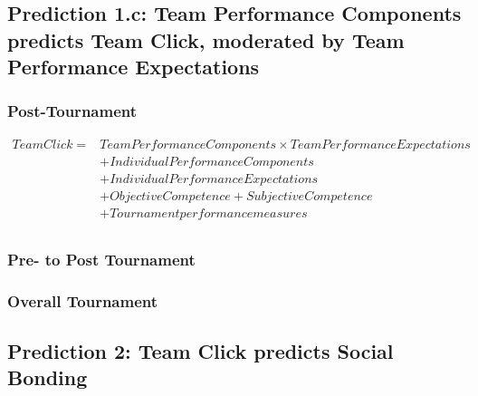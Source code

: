   \subsection{Prediction 1.c: Team Performance Components predicts Team Click, moderated by Team Performance Expectations}

  \subsubsection{Post-Tournament}

       \begin{align*}
         Team Click =  & Team Performance Components \times Team Performance Expectations \\
                   &+ Individual Performance Components \\
                   &+ Individual Performance Expectations \\
                   &+ Objective Competence + Subjective Competence  \\
                   &+ Tournament performance measures \\
       \end{align*}


  



  \subsubsection{Pre- to Post Tournament}

  \subsubsection{Overall Tournament}














  \subsection{Prediction 2: Team Click predicts Social Bonding \label{app8:MLM2}}




